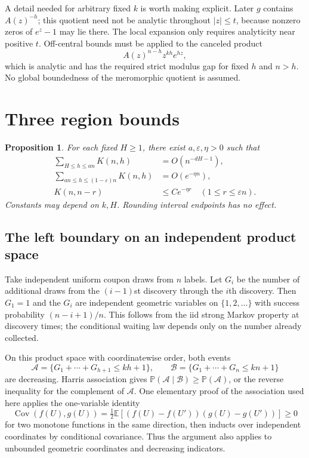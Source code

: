 \documentclass[11pt,letterpaper]{article}
\newtheorem{proposition}[theorem]{Proposition}
\theoremstyle{remark}\newtheorem{remark}[theorem]{Remark}
\numberwithin{equation}{section}
\newcommand{\E}{\mathbb E}\newcommand{\Prob}{\mathbb P}\newcommand{\Prb}{\mathbb P}
\begin{document}
A detail needed for arbitrary fixed $k$ is worth making explicit. Later $g$ contains $A(z)^{-h}$; this quotient need not be analytic throughout $|z|\le t$, because nonzero zeros of $e^z-1$ may lie there. The local expansion only requires analyticity near positive $t$. Off-central bounds must be applied to the canceled product
\[
A(z)^{n-h}z^{kh}e^{hz},
\]
which is analytic and has the required strict modulus gap for fixed $h$ and $n>h$. No global boundedness of the meromorphic quotient is assumed.

\section{Three region bounds}\label{asa:acc:sec:three-region}
\begin{proposition}\label{asa:acc:prop:tails}
For each fixed $H\ge1$, there exist $a,\varepsilon,\eta>0$ such that
\begin{align}
\sum_{H\le h\le an}K(n,h)&=O(n^{-dH-1}),\label{asa:acc:eq:left-tail}\\
\sum_{an\le h\le(1-\varepsilon)n}K(n,h)&=O(e^{-\eta n}),\label{asa:acc:eq:middle-tail}\\
K(n,n-r)&\le C e^{-\eta r}\quad(1\le r\le\varepsilon n).\label{asa:acc:eq:right-tail}
\end{align}
Constants may depend on $k,H$. Rounding interval endpoints has no effect.
\end{proposition}

\subsection{The left boundary on an independent product space}
Take independent uniform coupon draws from $n$ labels. Let $G_i$ be the number of additional draws from the $(i-1)$st discovery through the $i$th discovery. Then $G_1=1$ and the $G_i$ are independent geometric variables on $\{1,2,\ldots\}$ with success probability $(n-i+1)/n$. This follows from the iid strong Markov property at discovery times; the conditional waiting law depends only on the number already collected.

On this product space with coordinatewise order, both events
\[
\mathcal A=\{G_1+\cdots+G_{h+1}\le kh+1\},\qquad
\mathcal B=\{G_1+\cdots+G_n\le kn+1\}
\]
are decreasing. Harris association gives $\Prob(\mathcal A\mid\mathcal B)\ge\Prob(\mathcal A)$, or the reverse inequality for the complement of $\mathcal A$. One elementary proof of the association used here applies the one-variable identity
\[
\operatorname{Cov}(f(U),g(U))=\tfrac12\E[(f(U)-f(U'))(g(U)-g(U'))]\ge0
\]
for two monotone functions in the same direction, then inducts over independent coordinates by conditional covariance. Thus the argument also applies to unbounded geometric coordinates and decreasing indicators.
\end{document}
